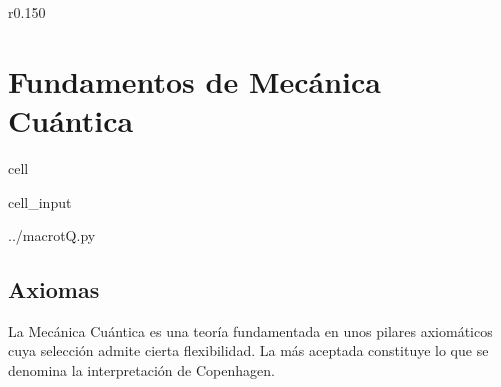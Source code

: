 \documentclass[letterpaper,10pt,english]{jupyterBook}
\begin{document}
\begin{wrapfigure}{r}{0.150\linewidth}
\centering
\noindent{}
\end{wrapfigure}


\chapter{Fundamentos de Mecánica Cuántica}
\label{\detokenize{docs/Part_01_Formalismo/Chapter_02_01_Fundamentos_MC_myst:fundamentos-de-mecanica-cuantica}}\label{\detokenize{docs/Part_01_Formalismo/Chapter_02_01_Fundamentos_MC_myst::doc}}
\sphinxAtStartPar

\begin{sphinxuseclass}{cell}\begin{sphinxVerbatimInput}

\begin{sphinxuseclass}{cell_input}
\begin{sphinxVerbatim}[commandchars=\\\{\}]
 ../macro\PYGZus{}tQ.py
 
   

   
   
   
   
   
  
\end{sphinxVerbatim}

\end{sphinxuseclass}\end{sphinxVerbatimInput}

\end{sphinxuseclass}

\section{Axiomas}
\label{\detokenize{docs/Part_01_Formalismo/Chapter_02_01_Fundamentos_MC_myst:axiomas}}
\sphinxAtStartPar
La Mecánica Cuántica es una teoría fundamentada en unos pilares axiomáticos cuya selección admite cierta flexibilidad. La más aceptada constituye lo que se denomina la interpretación de Copenhagen.
\end{document}
